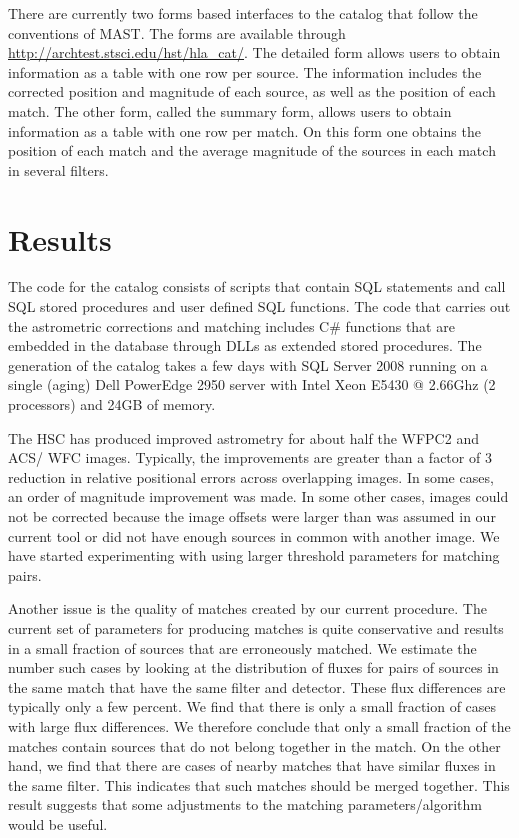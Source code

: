 There are currently two forms based interfaces to the catalog that follow the conventions of MAST. The forms are available through \url{http://archtest.stsci.edu/hst/hla_cat/}. The detailed form allows users to obtain information as a table with one row per source. The information includes the corrected position and magnitude of each source, as well as the position of each match. The other form, called the summary form, allows users to obtain information as a table with one row per match. On this form one obtains the position of each match and the average magnitude of the sources in each match in several filters.

\section{Results}


The code for the catalog consists  of scripts that contain SQL statements and call SQL stored procedures and user defined SQL functions. The code that carries out the astrometric corrections and matching includes  C\# functions that are embedded in the database through DLLs as extended stored procedures. The generation of the catalog takes a few days  with SQL Server 2008 running on a single (aging) Dell PowerEdge 2950 server with  Intel Xeon E5430 @ 2.66Ghz (2 processors) and 24GB of memory.

The HSC has produced improved astrometry for about half the WFPC2 and  ACS/ WFC images. Typically, the improvements are greater than a factor of 3 reduction in relative positional errors across overlapping images. In some cases, an order of magnitude improvement was made. In some other cases, images could not be corrected because the image offsets were larger than was assumed in our current tool or did not have enough sources in common  with another image. We have started experimenting with using larger threshold parameters for matching pairs.

Another issue is the quality of matches created by our current procedure. The current set of parameters for producing matches is quite conservative and results in a small fraction of sources that are erroneously matched. We estimate the number such cases by looking at the distribution of fluxes for pairs of sources in the same match that have the same filter and detector. These flux differences are typically only a few percent. We find that there is only a small fraction of cases with large flux differences.  We therefore conclude that only a small fraction of the matches contain sources that do not belong together in the match. On the other hand, we find that there are cases of nearby matches that have similar fluxes in the same filter. This indicates that such matches should be merged together. This result suggests that some adjustments to the matching parameters/algorithm would be useful.

